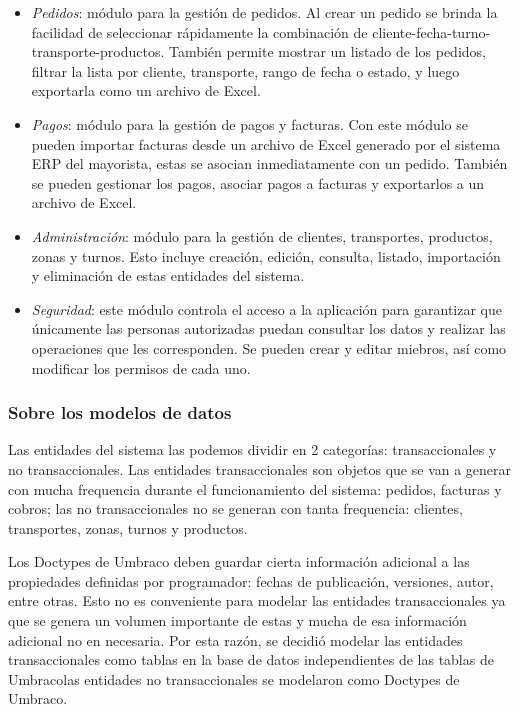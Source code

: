 \begin{itemize}
    \item \emph{Pedidos}: módulo para la gestión de pedidos. Al crear un pedido se brinda la facilidad de seleccionar rápidamente la combinación de cliente-fecha-turno-transporte-productos. También permite mostrar un listado de los pedidos, filtrar la lista por cliente, transporte, rango de fecha o estado, y luego exportarla como un archivo de Excel. 
    \item \emph{Pagos}: módulo para la gestión de pagos y facturas. Con este módulo se pueden importar facturas desde un archivo de Excel generado por el sistema ERP del mayorista, estas se asocian inmediatamente con un pedido. También se pueden gestionar los pagos, asociar pagos a facturas y exportarlos a un archivo de Excel.
    \item \emph{Administración}: módulo para la gestión de clientes, transportes, productos, zonas y turnos. Esto incluye creación, edición, consulta, listado, importación y eliminación de estas entidades del sistema.
    \item \emph{Seguridad}: este módulo controla el acceso a la aplicación para garantizar que únicamente las personas autorizadas puedan consultar los datos y realizar las operaciones que les corresponden. Se pueden crear y editar miebros, así como modificar los permisos de cada uno.
\end{itemize}

\subsubsection{Sobre los modelos de datos}
Las entidades del sistema las podemos dividir en 2 categorías: transaccionales y no transaccionales. Las entidades transaccionales son objetos que se van a generar con mucha frequencia durante el funcionamiento del sistema: pedidos, facturas y cobros; las no transaccionales no se generan con tanta frequencia: clientes, transportes, zonas, turnos y productos.

Los Doctypes de Umbraco deben guardar cierta información adicional a las propiedades definidas por programador: fechas de publicación, versiones, autor, entre otras. Esto no es conveniente para modelar las entidades transaccionales ya que se genera un volumen importante de estas y mucha de esa información adicional no en necesaria. Por esta razón, se decidió modelar las entidades transaccionales como tablas en la base de datos independientes de las tablas de Umbracolas entidades no transaccionales se modelaron como Doctypes de Umbraco.

